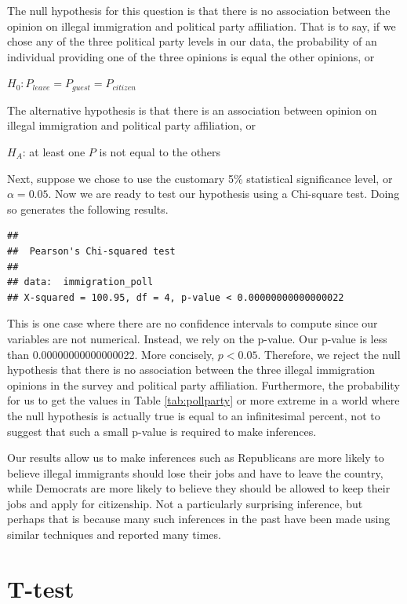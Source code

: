 \documentclass[
]{book}
\begin{document}
The null hypothesis for this question is that there is no association between the opinion on illegal immigration and political party affiliation. That is to say, if we chose any of the three political party levels in our data, the probability of an individual providing one of the three opinions is equal the other opinions, or

\(H_0: P_{leave} = P_{guest} = P_{citizen}\)

The alternative hypothesis is that there is an association between opinion on illegal immigration and political party affiliation, or

\(H_A\): at least one \(P\) is not equal to the others

Next, suppose we chose to use the customary 5\% statistical significance level, or \(\alpha=0.05\). Now we are ready to test our hypothesis using a Chi-square test. Doing so generates the following results.

\begin{verbatim}
## 
## 	Pearson's Chi-squared test
## 
## data:  immigration_poll
## X-squared = 100.95, df = 4, p-value < 0.00000000000000022
\end{verbatim}

This is one case where there are no confidence intervals to compute since our variables are not numerical. Instead, we rely on the p-value. Our p-value is less than 0.00000000000000022. More concisely, \(p<0.05\). Therefore, we reject the null hypothesis that there is no association between the three illegal immigration opinions in the survey and political party affiliation. Furthermore, the probability for us to get the values in Table \ref{tab:pollparty} or more extreme in a world where the null hypothesis is actually true is equal to an infinitesimal percent, not to suggest that such a small p-value is required to make inferences.

Our results allow us to make inferences such as Republicans are more likely to believe illegal immigrants should lose their jobs and have to leave the country, while Democrats are more likely to believe they should be allowed to keep their jobs and apply for citizenship. Not a particularly surprising inference, but perhaps that is because many such inferences in the past have been made using similar techniques and reported many times.

\hypertarget{t-test}{%
\section{T-test}\label{t-test}}
\end{document}
